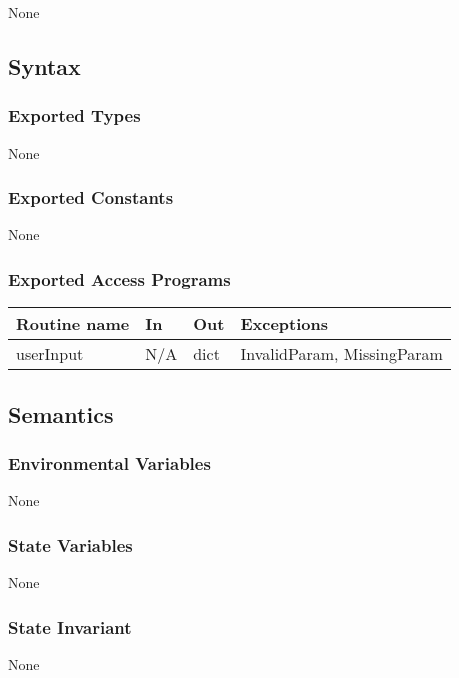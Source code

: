 \documentclass{article}
\begin{document}
None

\subsection* {Syntax}

\subsubsection* {Exported Types}

None

\subsubsection* {Exported Constants}

None

\subsubsection* {Exported Access Programs}

\begin{tabular}{| l | l | l | p{5cm} |}
\hline
\textbf{Routine name} & \textbf{In} & \textbf{Out} & \textbf{Exceptions}\\
\hline
userInput & N/A & dict & InvalidParam, MissingParam \\
\hline

\end{tabular}

\subsection* {Semantics}

\subsubsection* {Environmental Variables}

None

\subsubsection* {State Variables}

None

\subsubsection* {State Invariant}

None
\end{document}
